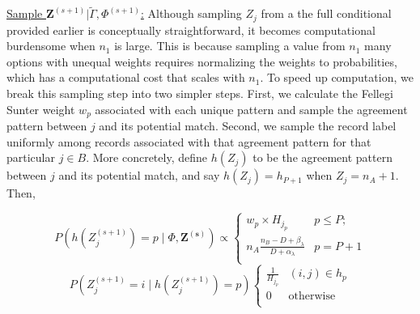 \documentclass[12pt,letterpaper]{article}
\newcommand{\1}[1]{\mathbb{I}\!\left[#1\right]} %
\begin{document}

\underline{Sample $\mathbf{Z}^{(s+1)}|\tilde{\Gamma}, \Phi^{(s+1)}$:} Although sampling \(Z_j\) from a the
full conditional provided earlier is conceptually straightforward, it
becomes computational burdensome when $n_1$ is large. This is because sampling a value from $n_1$ many options with unequal weights requires normalizing the weights to probabilities, which has a computational cost that scales with $n_1$. To speed up
computation, we break this sampling step into two simpler steps. First,
we calculate the Fellegi Sunter weight \(w_{p}\) associated with each
unique pattern and sample the agreement pattern between \(j\) and its
potential match. Second, we sample the record label uniformly among
records associated with that agreement pattern for that particular
\(j\in B\). More concretely, define \(h(Z_j)\) to be the agreement
pattern between \(j\) and its potential match, and say
\(h(Z_j) = h_{P+1}\) when \(Z_j = n_A + 1\). Then,

$$P\left(h\left(Z_j^{(s+1)}\right) = p \mid \Phi, \mathbf{Z^{(s)}}\right) \propto
\begin{cases} 
	w_{p}\times H_{j_p}  & p \leq P; \\
	n_A \frac{n_B - D + \beta_{\lambda}}{D + \alpha_{\lambda}} &   p = P + 1 \\
\end{cases}$$
$$P\left(Z_j^{(s+1)} = i \mid h\left(Z_j^{(s+1)}\right) = p\right) \begin{cases} 
	\frac{1}{H_{j_p}} & (i, j) \in h_p \\
	0 & \text{otherwise} \\
\end{cases}$$
\end{document}
